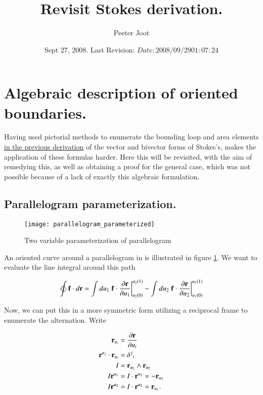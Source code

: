 \documentclass{article}
\title{ Revisit Stokes derivation. }
\author{Peeter Joot}
\date{ Sept 27, 2008.  Last Revision: $Date: 2008/09/29 01:07:24 $ }
\newcommand{\PD}[2]{\frac{\partial {#2}}{\partial {#1}}}
\begin{document}
\maketitle{}

\tableofcontents

\section{ Algebraic description of oriented boundaries. }

Having used pictorial methods to enumerate the bounding loop and area elements 
\href{http://www.geocities.com/peeter_joot/geometric_algebra/vector_integral_relations.pdf}{
in the previous derivation} of the vector and bivector forms of Stokes's, makes the application
of these formulas harder.  Here this will be revisited, with the aim of remedying this, as well as
obtaining a proof for the general case, which was not possible because of a lack of exactly this
algebraic formulation.

\subsection{ Parallelogram parameterization. }

\begin{figure}[htp]
\centering
\texttt{[image: parallelogram\_parameterized]}
\caption{Two variable parameterization of  parallelogram}\label{fig:parallelogram}
\end{figure}

An oriented curve around a parallelogram in  is illustrated in figure 
\ref{fig:parallelogram}.  We want to evaluate the line integral around this
path

\begin{align}\label{eqn:lineprep}
\ointclockwise \Bf \cdot d\Br
&=
\int du_1 \left.{\Bf \cdot \PD{u_1}{\Br} }\right\vert_{u_2(0)}^{u_2(1)}
-\int du_2 \left.{\Bf \cdot \PD{u_2}{\Br} }\right\vert_{u_1(0)}^{u_1(1)} \\
\end{align}

Now, we can put this in a more symmetric form utilizing a reciprocal 
frame to enumerate the alternation.  Write

\begin{align*}
\Br_{u_i} &= \PD{u_i}{\Br} \\
\Br^{u_j} \cdot \Br_{u_i} &= {\delta^j}_i \\
I &= \Br_{u_1} \wedge \Br_{u_2} \\
I \Br^{u_1} &=
I \cdot \Br^{u_1} =
- \Br_{u_2} \\
I \Br^{u_2} &=
I \cdot \Br^{u_2} =
 \Br_{u_1}.
\end{align*}
\end{document}
